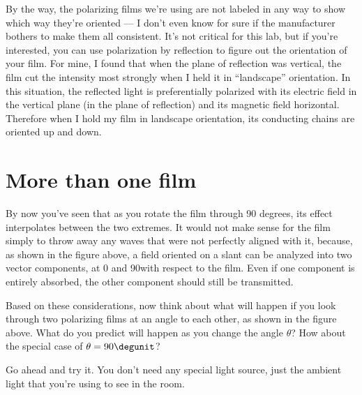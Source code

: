 By the way, the polarizing films we're using are not labeled in any way to show which way
they're oriented --- I don't even know for sure if the manufacturer bothers to make them
all consistent. It's not critical for this lab, but if you're interested, you can use polarization by reflection to figure
out the orientation of your film. For mine, I found that when the plane of reflection
was vertical, the film cut the intensity most strongly when I held it in ``landscape''
orientation. In this situation, the reflected light is preferentially polarized with its
electric field in the vertical plane (in the plane of reflection) and its magnetic field
horizontal. Therefore when I hold my film in landscape orientation, its conducting chains
are oriented up and down.



\section{More than one film}



By now you've seen that as you rotate the film through 90 degrees,
its effect interpolates between the two extremes.
It would not
make sense for the film simply to throw away any waves that
were not perfectly aligned with it, because, as shown in the figure above, a field oriented
on a slant can be analyzed into two vector components, at 0
and 90\degunit with respect to the film. Even if one
component is entirely absorbed, the other component should
still be transmitted.


Based on these considerations, now think about what will
happen if you look through two polarizing films at an angle
to each other, as shown in the figure above.  What do you predict will
happen as you change the angle $\theta $? How about the special case of $\theta=90\degunit$?

Go ahead and try it. You don't
need any special light source, just the ambient light that
you're using to see in the room.



